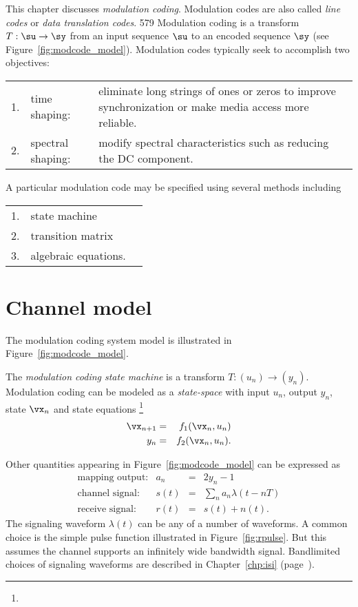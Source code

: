 This chapter discusses {\em modulation coding}. 
Modulation codes are also called {\em line codes} or 
{\em data translation codes}. \citep{proakis}{579}
Modulation coding is a transform $T:\su\to\sy$
from an input sequence $\su$ to an encoded sequence $\sy$
(see Figure~\ref{fig:modcode_model}).
Modulation codes typically seek to accomplish two objectives:

\begin{tabular}{llp{10cm}}
   1.& time shaping: & 
     eliminate long strings of ones or zeros to improve synchronization
     or make media access more reliable.
\\
   2.& spectral shaping: &
     modify spectral characteristics such as reducing the DC component.
\end{tabular}

A particular modulation code may be specified using several 
methods including

\begin{tabular}{llp{10cm}}
   1.& state machine \\
   2.& transition matrix \\
   3.& algebraic equations.
\end{tabular}

\section{Channel model}
The modulation coding system model is illustrated in 
Figure~\ref{fig:modcode_model}.

The {\em modulation coding state machine} is a transform
$T:(u_n)\to(y_n)$.
Modulation coding can be modeled as a {\em state-space} with
input $u_n$, output $y_n$, state $\vx_n$ and state equations 
\footnote{}
\begin{eqnarray*}
   \vx_{n+1} &=& f_1(\vx_n, u_n) \\
   y_n         &=& f_2(\vx_n, u_n).
\end{eqnarray*}

Other quantities appearing in Figure~\ref{fig:modcode_model}
can be expressed as
\[
\begin{array}{lrcl}
   \mbox{mapping output:}   & a_n &=& 2y_n-1  \\
   \mbox{channel signal:}   & s(t)&=& \sum_n a_n \lambda(t-nT) \\
   \mbox{receive signal:}   & r(t)&=& s(t) + n(t).
\end{array}
\]
The signaling waveform $\lambda(t)$ can be any of a number of waveforms.
A common choice is the simple pulse function illustrated in 
Figure~\ref{fig:rpulse}.
But this assumes the channel supports an infinitely wide bandwidth signal.
Bandlimited choices of signaling waveforms are described in 
Chapter~\ref{chp:isi} (page~\pageref{chp:isi}).

